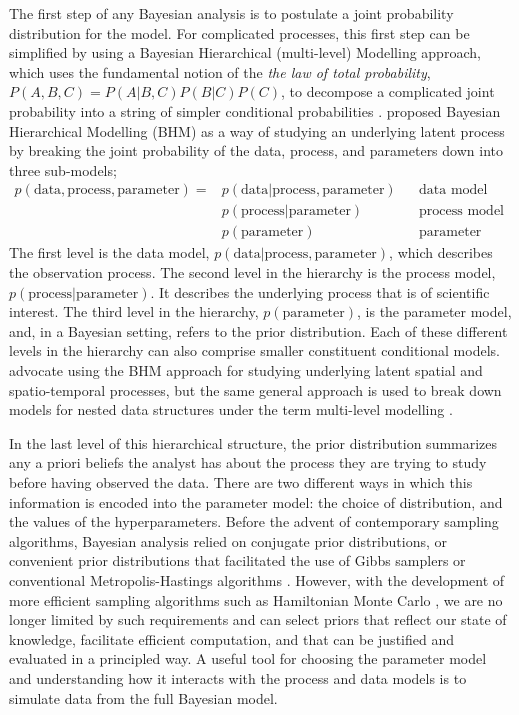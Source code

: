 The first step of any Bayesian analysis is to postulate a joint probability distribution for the model. For complicated processes, this first step can be simplified by using a Bayesian Hierarchical (multi-level) Modelling approach, which uses the fundamental notion of the \textit{the law of total probability}, $P(A, B, C) = P(A|B, C) P(B|C) P(C)$, to decompose a complicated joint probability into a string of simpler conditional probabilities \citep[p.~13]{wikle_2019}. \citet{Berliner_1996} proposed Bayesian Hierarchical Modelling (BHM) as a way of studying an underlying latent process by breaking the joint probability of the data, process, and parameters down into three sub-models;
\begin{align*}
 p(\text{data}, \text{process}, \text{parameter}) = & p(\text{data}| \text{process}, \text{parameter}) && \text{data model} \\
  & p(\text{process}| \text{parameter}) && \text{process model} \\
  & p(\text{parameter}) && \text{parameter model}
\end{align*}
The first level is the data model, $p(\text{data} | \text{process}, \text{parameter})$, which describes the observation process. The second level in the hierarchy is the process model, $p(\mbox{process} | \text{parameter})$. It describes the underlying process that is of scientific interest. The third level in the hierarchy, $p(\text{parameter})$, is the parameter model, and, in a Bayesian setting, refers to the prior distribution. Each of these different levels in the hierarchy can also comprise smaller constituent conditional models. \citet{cressie_2011} advocate using the BHM approach for studying underlying latent spatial and spatio-temporal processes, but the same general approach is used to break down models for nested data structures under the term multi-level modelling \citep{BDA2020}. 

In the last level of this hierarchical structure, the prior distribution summarizes any a priori beliefs the analyst has about the process they are trying to study before having observed the data. There are two different ways in which this information is encoded into the parameter model: the choice of distribution, and the values of the hyperparameters. Before the advent of contemporary sampling algorithms, Bayesian analysis relied on conjugate prior distributions, or convenient prior distributions that facilitated the use of Gibbs samplers or conventional Metropolis-Hastings algorithms \citep{gilks_1996}. However, with the development of more efficient sampling algorithms such as Hamiltonian Monte Carlo \citep{betancourt_2017}, we are no longer limited by such requirements and can select priors that reflect our state of knowledge, facilitate efficient computation, and that can be justified and evaluated in a principled way. A useful tool for choosing the parameter model and understanding how it interacts with the process and data models is to simulate data from the full Bayesian model.

